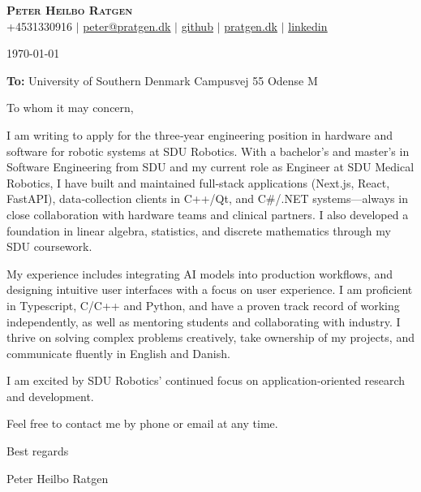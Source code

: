 \documentclass{article}
\begin{document}
\begin{center}
  \textbf{\huge{\scshape{Peter Heilbo Ratgen}}}\\ 
  \vspace{0.2cm}
  \small +4531330916 $|$
  \href{mailto:peter@pratgen.dk}{\underline{peter@pratgen.dk}} $|$
  \href{https://github.com/ratgen }{\underline{github}} $|$
  \href{https://pratgen.dk}{\underline{pratgen.dk}} $|$
  \href{https://www.linkedin.com/in/peter-ratgen-a1236529/}{\underline{linkedin}}
\end{center}
\vspace{0.5cm}

\begin{flushright}
  \today
\end{flushright}
\begin{flushleft}
\textbf{To:}\newline
University of Southern Denmark \newline
Campusvej 55  Odense M
\end{flushleft}
\vspace{0.5cm}

To whom it may concern, \vspace{\baselineskip}

I am writing to apply for the three‑year engineering position in hardware and
software for robotic systems at SDU Robotics. With a bachelor’s and master’s in
Software Engineering from SDU and my current role as Engineer at SDU Medical
Robotics, I have built and maintained full‑stack applications (Next.js, React,
FastAPI), data‑collection clients in C++/Qt, and C#/.NET systems—always in close
collaboration with hardware teams and clinical partners. I also developed a
foundation in linear algebra, statistics, and discrete mathematics through my SDU
coursework.
\vspace{\baselineskip}

My experience includes integrating AI models into production workflows, and
designing intuitive user interfaces with a focus on user experience. I am
proficient in Typescript, C/C++ and Python, and have a proven track record of
working independently, as well as mentoring students and collaborating with
industry. I thrive on solving complex problems creatively, take ownership of my
projects, and communicate fluently in English and Danish. \vspace{\baselineskip}

I am excited by SDU Robotics’ continued focus on application‑oriented research and
development. \vspace{\baselineskip}

Feel free to contact me by phone or email at any time. \vspace{\baselineskip}

\begin{flushleft}
Best regards 

\vspace{\baselineskip} Peter Heilbo Ratgen
\end{flushleft}
\end{document}
